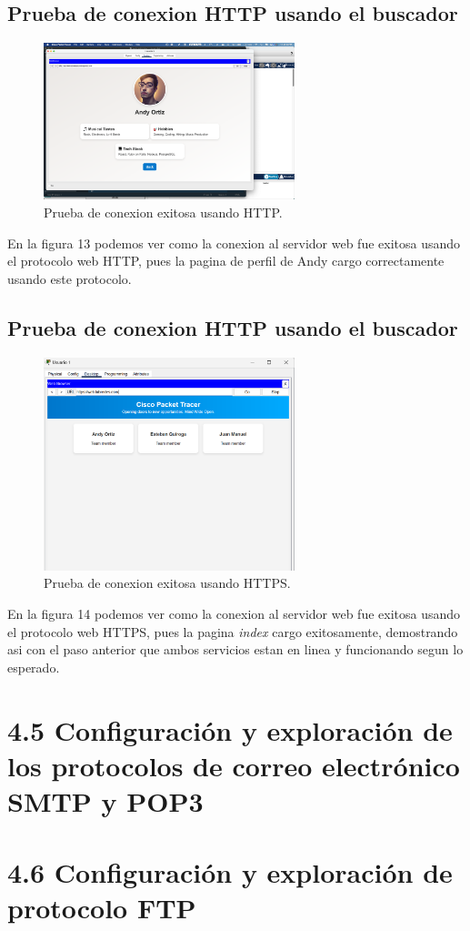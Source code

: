 \documentclass[10pt]{article}
\begin{document}
\subsection{Prueba de conexion HTTP usando el buscador}
\begin{figure}[H]
    \centering
    \includegraphics[width=0.65\textwidth]{lab-01-screenshots/44-2-andy-profile.png}
    \caption{Prueba de conexion exitosa usando HTTP.}
\end{figure}
En la figura 13 podemos ver como la conexion al servidor web fue exitosa usando el protocolo web HTTP, pues la pagina de perfil de Andy cargo correctamente usando este protocolo.
\subsection{Prueba de conexion HTTP usando el buscador}
\begin{figure}[H]
    \centering
    \includegraphics[width=0.65\textwidth]{lab-01-screenshots/44-3-https.png}
    \caption{Prueba de conexion exitosa usando HTTPS.}
\end{figure}
En la figura 14 podemos ver como la conexion al servidor web fue exitosa usando el protocolo web HTTPS, pues la pagina \textit{index} cargo exitosamente, demostrando asi con el paso anterior que ambos servicios estan en linea y funcionando segun lo esperado.

\section{4.5 Configuración y exploración de los protocolos de correo electrónico SMTP y POP3}
\section{4.6 Configuración y exploración de protocolo FTP}
\end{document}
